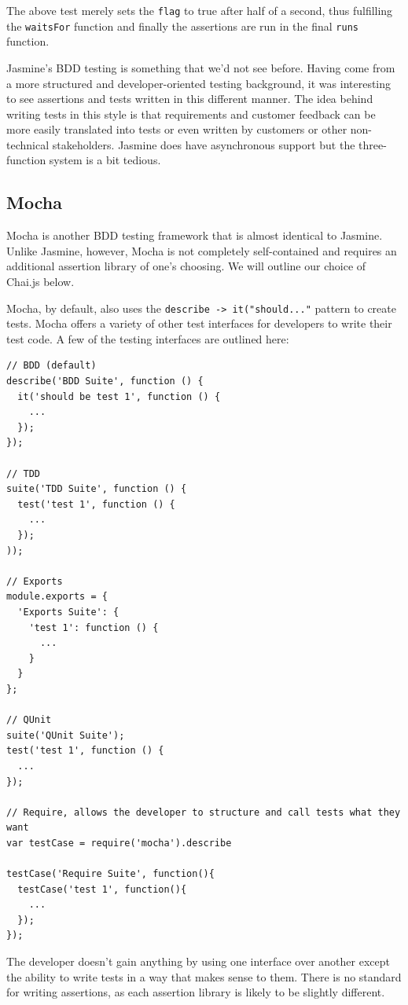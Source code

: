 \documentclass[12pt]{ucthesis}
\begin{document}
The above test merely sets the \lstinline{flag} to true after half of a second, thus fulfilling the \lstinline{waitsFor} function and finally the assertions are run in the final \lstinline{runs} function.

Jasmine's BDD testing is something that we'd not see before. Having come from a more structured and developer-oriented testing background, it was interesting to see assertions and tests written in this different manner. The idea behind writing tests in this style is that requirements and customer feedback can be more easily translated into tests or even written by customers or other non-technical stakeholders. Jasmine does have asynchronous support but the three-function system is a bit tedious.

\subsection{Mocha}
Mocha\cite{Mocha} is another BDD testing framework that is almost identical to Jasmine. Unlike Jasmine, however, Mocha is not completely self-contained and requires an additional assertion library of one's choosing. We will outline our choice of Chai.js below.

Mocha, by default, also uses the \lstinline{describe -> it("should..."} pattern to create tests. Mocha offers a variety of other test interfaces for developers to write their test code. A few of the testing interfaces are outlined here:
\begin{lstlisting}
// BDD (default)
describe('BDD Suite', function () {
  it('should be test 1', function () {
    ...
  });
});

// TDD
suite('TDD Suite', function () {
  test('test 1', function () {
    ...
  });
));

// Exports
module.exports = {
  'Exports Suite': {
    'test 1': function () {
      ...
    }
  }
};

// QUnit
suite('QUnit Suite');
test('test 1', function () {
  ...
});

// Require, allows the developer to structure and call tests what they want
var testCase = require('mocha').describe

testCase('Require Suite', function(){
  testCase('test 1', function(){
    ...
  });
});
\end{lstlisting}
The developer doesn't gain anything by using one interface over another except the ability to write tests in a way that makes sense to them. There is no standard for writing assertions, as each assertion library is likely to be slightly different.
\end{document}
